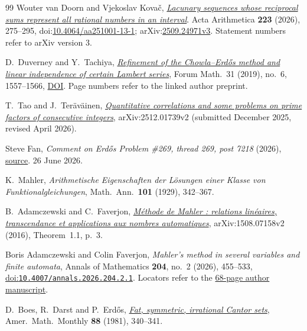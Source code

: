 \documentclass[11pt]{article}
\begin{document}
\begin{thebibliography}{99}
 Wouter van Doorn and Vjekoslav Kova\v{c}, \href{https://arxiv.org/abs/2509.24971v3}{\emph{Lacunary sequences whose reciprocal sums represent all rational numbers in an interval}}.
  Acta Arithmetica \textbf{223} (2026), 275--295, doi:\href{https://doi.org/10.4064/aa251001-13-1}{10.4064/aa251001-13-1}; arXiv:\href{https://arxiv.org/abs/2509.24971v3}{2509.24971v3}. Statement numbers refer to arXiv version 3.

 D.~Duverney and Y.~Tachiya,
  \href{https://danielduverney.fr/documents/theorie-des-nombres/DuverneyTachiya190522.pdf}
  {\emph{Refinement of the Chowla--Erd\H{o}s method and linear independence
  of certain Lambert series}},
  Forum Math.\ 31 (2019), no.~6, 1557--1566,
  \href{https://doi.org/10.1515/forum-2018-0299}{DOI}.  Page numbers refer to
  the linked author preprint.

 T.~Tao and J.~Ter\"av\"ainen,
  \href{https://arxiv.org/abs/2512.01739v2}{\emph{Quantitative correlations and
  some problems on prime factors of consecutive integers}}, arXiv:2512.01739v2
  (submitted December 2025, revised April 2026).

 Steve Fan,
  \emph{Comment on Erd\H{o}s Problem \#269, thread 269, post 7218} (2026),
  \href{https://www.erdosproblems.com/forum/thread/269#post-7218}{source}. 26 June 2026.

 K.~Mahler, \emph{Arithmetische Eigenschaften der L\"osungen
  einer Klasse von Funktionalgleichungen}, Math.\ Ann.\ \textbf{101} (1929),
  342--367.

 B.~Adamczewski and C.~Faverjon,
  \href{https://arxiv.org/abs/1508.07158v2}{\emph{M\'ethode de Mahler : relations
  lin\'eaires, transcendance et applications aux nombres automatiques}},
  arXiv:1508.07158v2 (2016), Theorem~1.1, p.~3.

 Boris Adamczewski and Colin Faverjon,
  \emph{Mahler's method in several variables and finite automata},
  Annals of Mathematics \textbf{204}, no.~2 (2026), 455--533,
  \href{https://doi.org/10.4007/annals.2026.204.2.1}{doi:\nolinkurl{10.4007/annals.2026.204.2.1}}.
  Locators refer to the
  \href{https://faverjon.perso.math.cnrs.fr/AdamczewskiFaverjon_MahlerFiniteAutomata.pdf}{68-page author manuscript}.

 D.~Boes, R.~Darst and P.~Erd\H{o}s,
  \href{https://www.tandfonline.com/doi/abs/10.1080/00029890.1981.11995266}{\emph{Fat,
  symmetric, irrational Cantor sets}}, Amer.\ Math.\ Monthly \textbf{88} (1981),
  340--341.


\end{thebibliography}
\end{document}
